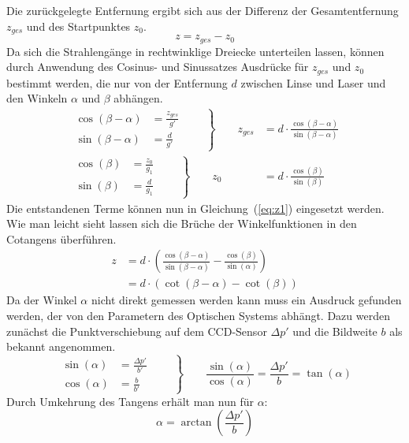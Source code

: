 Die zurückgelegte Entfernung ergibt sich aus der Differenz der Gesamtentfernung $z_{ges}$ und des Startpunktes $z_0$.
\begin{equation}
	z = z_{ges} - z_0
	\label{eq:z1}
\end{equation}
Da sich die Strahlengänge in rechtwinklige Dreiecke unterteilen lassen, können durch Anwendung des Cosinus- und Sinussatzes Ausdrücke für $z_{ges}$ und $z_0$ bestimmt werden, die nur von der Entfernung $d$ zwischen Linse und Laser und den Winkeln $\alpha$ und $\beta$ abhängen.
\begin{align}
	\left.\begin{aligned}
		\cos(\beta-\alpha) &= \frac{z_{ges}}{g'}\\
		\sin(\beta-\alpha) &= \frac{d}{g'}
	\end{aligned}\qquad\right\}\qquad z_{ges} &= d\cdot\frac{\cos(\beta-\alpha)}{\sin(\beta-\alpha)}\\[1em]
	\left.\begin{aligned}
		\cos(\beta) &= \frac{z_0}{g_1}\\ 
		\sin(\beta) &= \frac{d}{g_1}
	\end{aligned}\qquad\right\}\qquad z_0 &= d\cdot\frac{\cos(\beta)}{\sin(\beta)}
\end{align}
Die entstandenen Terme können nun in Gleichung~(\ref{eq:z1}) eingesetzt werden. Wie man leicht sieht lassen sich die Brüche der Winkelfunktionen in den Cotangens überführen. 
\begin{align}
	z &= d\cdot\left(\frac{\cos(\beta-\alpha)}{\sin(\beta-\alpha)}-\frac{\cos(\beta)}{\sin(\alpha)}\right)\\
	  &= d\cdot\left(\cot(\beta-\alpha)-\cot(\beta)\right)
	  \label{eq:z2}
\end{align}
Da der Winkel $\alpha$ nicht direkt gemessen werden kann muss ein Ausdruck gefunden werden, der von den Parametern des Optischen Systems abhängt. Dazu werden zunächst die Punktverschiebung auf dem CCD-Sensor $\Delta p'$ und die Bildweite $b$ als bekannt angenommen.
\begin{equation}
	\left.\begin{aligned}
		\sin(\alpha) &= \frac{\Delta p'}{b'}\\
	\cos(\alpha) &= \frac{b}{b'}
	\end{aligned}\qquad\right\}\qquad
	\frac{\sin(\alpha)}{\cos(\alpha)} = \frac{\Delta p'}{b} = \tan(\alpha)
\end{equation}
Durch Umkehrung des Tangens erhält man nun für $\alpha$:
\begin{equation}
	\alpha = \arctan\left(\frac{\Delta p'}{b}\right)
	\label{eq:alpha}
\end{equation}
